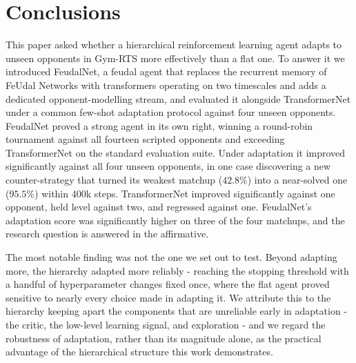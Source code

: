 \documentclass[sigconf,review=false]{acmart}
\begin{document}
\section{Conclusions}
\label{conclusions}

This paper asked whether a hierarchical reinforcement learning agent adapts to unseen opponents in Gym-\textmu RTS more effectively than a flat one. 
To answer it we introduced FeudalNet, a feudal agent that replaces the recurrent memory of FeUdal Networks with transformers operating on two timescales and adds a dedicated opponent-modelling stream, and evaluated it alongside TransformerNet under a common few-shot adaptation protocol against four unseen opponents. FeudalNet proved a strong agent in its own right, winning a round-robin tournament against all fourteen scripted opponents and exceeding TransformerNet on the standard evaluation suite. 
Under adaptation it improved significantly against all four unseen opponents, in one case discovering a new counter-strategy that turned its weakest matchup ($42.8\%$) into a near-solved one ($95.5\%$) within 400k steps. 
TransformerNet improved significantly against one opponent, held level against two, and regressed against one. 
FeudalNet's adaptation score was significantly higher on three of the four matchups, and the research question is answered in the affirmative.

The most notable finding was not the one we set out to test. 
Beyond adapting more, the hierarchy adapted more reliably - reaching the stopping threshold with a handful of hyperparameter changes fixed once, where the flat agent proved sensitive to nearly every choice made in adapting it. 
We attribute this to the hierarchy keeping apart the components that are unreliable early in adaptation - the critic, the low-level learning signal, and exploration - and we regard the robustness of adaptation, rather than its magnitude alone, as the practical advantage of the hierarchical structure this work demonstrates.
\end{document}
